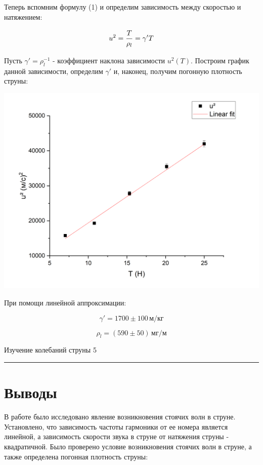\documentclass[12pt,a4paper]{scrartcl}
\begin{document}
	Теперь вспомним формулу (1) и определим зависимость между скоростью и натяжением:
	
	$$u^2 = \dfrac{\strut T}{\strut \rho_l} = \gamma'T$$
	
	Пусть $\gamma' = \rho_l^{-1}$ - коэффициент наклона зависимости $u^2(T)$. Построим график данной зависимости, определим $\gamma'$ и, наконец, получим погонную плотность струны:
	
	\begin{center}
		\includegraphics[scale=0.5]{PIC_3.png}
	\end{center}

	При помощи линейной аппроксимации:
	
	$$\gamma' = 1700 \pm 100\,\text{м/кг}$$
	
	$$\rho_l = (590 \pm 50) \,\text{мг/м}$$
	
	
	\newpage
	
	\begin{flushleft}
		\footnotesize{Изучение колебаний струны} \hspace{\fill} \footnotesize{5}
		\\[-0.3cm]\noindent\rule{\textwidth}{0.3pt}
	\end{flushleft}
	
	\section{Выводы}
		В работе было исследовано явление возникновения стоячих волн в струне. Установлено, что зависимость частоты гармоники от ее номера является линейной, а зависимость скорости звука в струне от натяжения струны - квадратичной. Было проверено условие возникновения стоячих волн в струне, а также определена погонная плотность струны:
		
\end{document}

